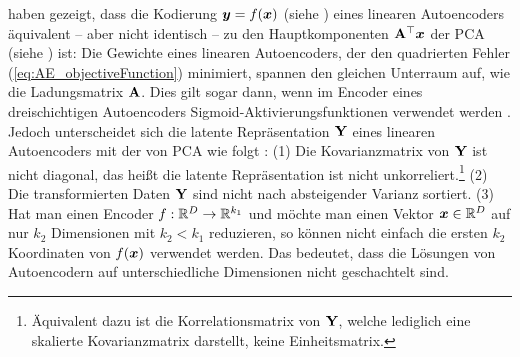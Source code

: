 \textcites{Baldi.1989}{Bourlard.1988} haben gezeigt, dass die Kodierung $\bm{y} = f(\bm{x})$ (siehe ) eines linearen Autoencoders äquivalent -- aber nicht identisch -- zu den Hauptkomponenten $\mathbf{A}^\top\bm{x}$ der PCA (siehe ) ist: Die Gewichte eines linearen Autoencoders, der den quadrierten Fehler (\eqref{eq:AE_objectiveFunction}) minimiert, spannen den gleichen Unterraum auf, wie die Ladungsmatrix $\mathbf{A}$. Dies gilt sogar dann, wenn im Encoder eines dreischichtigen Autoencoders Sigmoid-Aktivierungsfunktionen verwendet werden \parencite[291, 293]{Bourlard.1988}. Jedoch unterscheidet sich die latente Repräsentation $\mathbf{Y}$
eines linearen Autoencoders mit der von PCA wie folgt \parencite[3]{Plaut.2018}: (1) Die Kovarianzmatrix von $\mathbf{Y}$ ist nicht diagonal, das heißt die
latente Repräsentation ist nicht unkorreliert.\footnote{Äquivalent dazu ist die Korrelationsmatrix
	von $\mathbf{Y}$, welche lediglich eine skalierte Kovarianzmatrix darstellt, keine Einheitsmatrix.}
(2) Die transformierten Daten $\mathbf{Y}$ sind nicht nach absteigender Varianz sortiert. (3) Hat man
einen Encoder $f: \mathbb{R}^D \rightarrow \mathbb{R}^{k_1}$ und möchte man einen Vektor $\bm{x} \in
	\mathbb{R}^D$ auf nur $k_2$ Dimensionen mit $k_2 < k_1$ reduzieren, so können nicht einfach die ersten
$k_2$ Koordinaten von $f(\bm{x})$ verwendet werden. Das bedeutet, dass die Lösungen von
Autoencodern auf unterschiedliche Dimensionen nicht geschachtelt sind.

